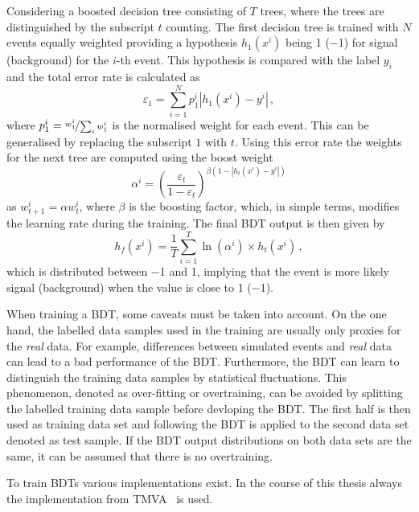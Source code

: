 Considering a boosted decision tree consisting of $T$ trees, where the trees are distinguished by the subscript $t$ counting.
The first decision tree is trained with $N$ events equally weighted providing a hypothesis $h_1(x^i)$ being \num{+1} (\num{-1}) for signal (background) for the $i$-th event.
This hypothesis is compared with the label $y_i$ and the total error rate is calculated as
\begin{equation}
\varepsilon_1=\sum_{i=1}^{N}p^i_1\left|h_1(x^i)-y^i\right|\,,
\end{equation}
where $p_1^i=\nicefrac{w_1^i}{\sum_{i}w_1^i}$ is the normalised weight for each event.
This can be generalised by replacing the subscript $1$ with $t$.
Using this error rate the weights for the next tree are computed using the boost weight
\begin{equation}
\alpha^i=\left(\frac{\varepsilon_t}{1-\varepsilon_t}\right)^{\beta\left(1-\left|h_t(x^i)-y^i\right|\right)}
\end{equation}
as $w_{t+1}^i=\alpha w_t^i$, where $\beta$ is the boosting factor,  which, in simple terms, modifies the learning rate during the training.
The final BDT output is then given by
\begin{equation}
h_f(x^i)=\frac{1}{T}\sum_{i=1}^{T}\ln\left(\alpha^i\right)\times h_t(x^i)\,,
\end{equation}
which is distributed between \num{-1} and \num{+1}, implying that the event is more likely signal (background) when the value is close to \num{+1} (\num{-1}).

When training a \ac{BDT}, some caveats must be taken into account.
On the one hand, the labelled data samples used in the training are usually only proxies for the \emph{real} data.
For example, differences between simulated events and \emph{real} data can lead to a bad performance of the \ac{BDT}.
Furthermore, the \ac{BDT} can learn to distinguish the training data samples by statistical fluctuations.
This phenomenon, denoted as over-fitting or overtraining, can be avoided by splitting the labelled training data sample before devloping the \ac{BDT}.
The first half is then used as training data set and following the \ac{BDT} is applied to the second data set denoted as test sample.
If the \ac{BDT} output distributions on both data sets are the same, it can be assumed that there is no overtraining.

To train \ac{BDT}s various implementations exist.
In the course of this thesis always the implementation from TMVA~\cite{Hocker:2007ht} is used.


